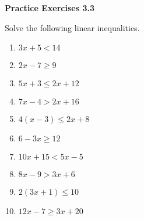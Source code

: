   \vspace{1ex}
\noindent\textbf{Practice Exercises 3.3}

\vspace{0.75ex}

Solve the following linear inequalities.%
\begin{multicols}{2}
\begin{enumerate}[noitemsep, label = \color{blue}\arabic*. ]    \item $3x + 5 < 14$
    \item $2x - 7 \geq 9$
    \item $5x + 3 \leq 2x + 12$
    \item $7x - 4 > 2x + 16$
    \item $4(x - 3) \leq 2x + 8$
    \item $6 - 3x \geq 12$
    \item $10x + 15 < 5x - 5$
    \item $8x - 9 > 3x + 6$
    \item $2(3x + 1) \leq 10$
    \item $12x - 7 \geq 3x + 20$
\end{enumerate}
\end{multicols}


